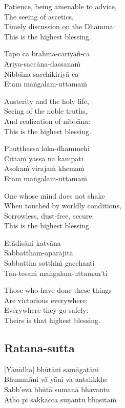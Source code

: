 \begin{english}
  Patience, being amenable to advice,\\
  The seeing of ascetics,\\
  Timely discussion on the Dhamma:\\
  This is the highest blessing.
\end{english}

Tapo ca brahma-cariyañ-ca\\
Ariya-saccāna-dassanaṁ\\
Nibbāna-sacchikiriyā ca\\
Etam maṅgalam-uttamaṁ

\begin{english}
  Austerity and the holy life,\\
  Seeing of the noble truths,\\
  And realization of nibbāna:\\
  This is the highest blessing.
\end{english}

Phuṭṭhassa loka-dhammehi\\
Cittaṁ yassa na kampati\\
Asokaṁ virajaṁ khemaṁ\\
Etam maṅgalam-uttamaṁ

\begin{english}
  One whose mind does not shake\\
  When touched by worldly conditions,\\
  Sorrowless, dust-free, secure:\\
  This is the highest blessing.
\end{english}

Etādisāni katvāna\\
Sabbattham-aparājitā\\
Sabbattha sotthiṁ gacchanti\\
Tan-tesaṁ maṅgalam-uttaman’ti

\begin{english}
  Those who have done these things\\
  Are victorious everywhere;\\
  Everywhere they go safely:\\
  Theirs is that highest blessing.
\end{english}
\suttaRef{[Snp 2.4]}

\subsection{Ratana-sutta}
[Yānīdha] bhūtāni samāgatāni\\
Bhummāni vā yāni va antalikkhe\\
Sabb’eva bhūtā sumanā bhavantu\\
Atho pi sakkacca suṇantu bhāsitaṁ

